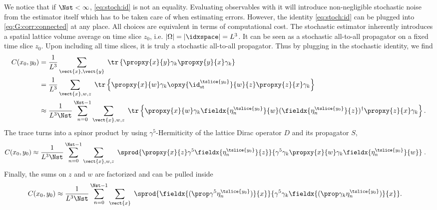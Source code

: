 We notice that if $\Nst < \infty$, \cref{eq:stoch:id} is not an equality.
Evaluating observables with it will introduce non-negligible stochastic noise from the estimator itself which has to be taken care of when estimating errors.
However, the identity \cref{eq:stoch:id} can be plugged into \cref{eq:G:corr:connected} at any place.
All choices are equivalent in terms of computational cost.
The stochastic estimator inherently introduces a spatial lattice volume average on time slice $z_0$, i.e. $\lvert \Omega \rvert = \lvert \idxspace \rvert = L^{3}$.
It can be seen as a stochastic all-to-all propagator on a fixed time slice $z_0$.
Upon including all time slices, it is truly a stochastic all-to-all propagator.
Thus by plugging in the stochastic identity, we find
\begin{align}
C(x_0, y_0)
&= \frac{1}{L^{3}} \sum_{\vect{x}, \vect{y}} \;
\tr \left\{ \propxy{x}{y} \gamma_k \propxy{y}{x} \gamma_k \right\} \\
&= \frac{1}{L^{3}} \sum_{\vect{x}, w, z} \;
\tr \left\{
  \propxy{x}{w} \gamma_k
  \opxy{\id^{\tslice{y_0}}_{\text{st}}}{w}{z}
  \propxy{z}{x} \gamma_k
\right\} \\
&\approx \frac{1}{L^{3} \Nst} \sum_{n=0}^{\Nst-1} \sum_{\vect{x}, w, z} \;
\tr \left\{
  \propxy{x}{w} \gamma_k
  \fieldx{\eta_n^{\tslice{y_0}}}{w}
  (\fieldx{\eta_n^{\tslice{y_0}}}{z})^{\dagger}
  \propxy{z}{x} \gamma_k
\right\}.
\end{align}
The trace turns into a spinor product by using $\gamma^{5}$-Hermiticity of the lattice Dirac operator $D$ and its propagator $S$,
\begin{align}
C(x_0, y_0)
&\approx \frac{1}{L^{3} \Nst} \sum_{n=0}^{\Nst-1} \sum_{\vect{x}, w, z} \;
\sprod{
  \propxy{x}{z}
  \gamma^{5}
  \fieldx{\eta_n^{\tslice{y_0}}}{z}
}{
  \gamma^{5}
  \gamma_k
  \propxy{x}{w}
  \gamma_k
  \fieldx{\eta_n^{\tslice{y_0}}}{w}
} \;.
\end{align}
Finally, the sums on $z$ and $w$ are factorized and can be pulled inside
\begin{align} \label{eq:stoch:C:full}
C(x_0, y_0)
&\approx \frac{1}{L^{3} \Nst} \sum_{n=0}^{\Nst-1} \sum_{\vect{x}} \;
\sprod{
  \fieldx{(\prop
  \gamma^{5}
  \eta_n^{\tslice{y_0}})}{x}
}{
  \gamma^{5}
  \gamma_k
  \fieldx{(\prop \gamma_k
  \eta_n^{\tslice{y_0}})}{x}
}.
\end{align}
